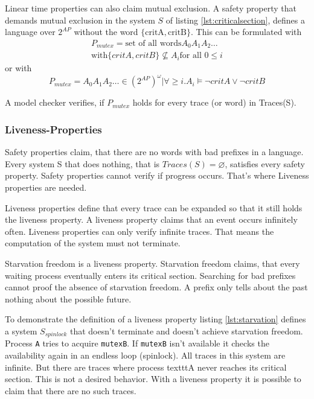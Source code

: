 \documentclass[12pt,a4paper,twoside]{article}
\begin{document}
Linear time properties can also claim mutual exclusion. A safety property that demands mutual exclusion in the system $S$ of listing \ref{lst:criticalsection}, defines a language over $2^{AP}$ without the word $\{\text{critA},\text{critB}\}$. This can be formulated with
\begin{multline}
  \label{eq:mutexinwords}
  P_{mutex} = \text{set of all words} A_0 A_1 A_2 \dots \\ \text{with} \{critA,critB\} \not \subseteq A_i \text{for all } 0 \leq i
\end{multline}
or with
\begin{equation}
  \label{eq:mutex}
P_{mutex}   = {A_0 A_1 A_2 \dots \in (2^{AP})^{\omega} | \forall \geq i.   A_i \models \neg critA \lor \neg critB}
\end{equation}

A model checker verifies, if $P_{mutex}$ holds for every trace (or word) in Tra\-ces(S).

\subsubsection{Liveness-Properties}
\label{sec:liveness}

Safety properties claim, that there are no words with bad prefixes in a language. Every system S that does nothing, that is $Traces(S)=\varnothing$, satisfies every safety property. Safety properties cannot verify if progress occurs. That's where Liveness properties are needed.

Liveness properties define that every trace can be expanded so that it still holds the liveness property. A liveness property claims that an event occurs infinitely often. Liveness properties can only verify infinite traces. That means the computation of the system must not terminate.

Starvation freedom is a liveness property. Starvation freedom claims, that every waiting process eventually enters its critical section. Searching for bad prefixes cannot proof the absence of starvation freedom. A prefix only tells about the past nothing about the possible future.



To demonstrate the definition of a liveness property listing \ref{lst:starvation} defines a system $S_{spinlock}$ that doesn't terminate and doesn't achieve starvation freedom. Process \texttt{A} tries to acquire \texttt{mutexB}. If \texttt{mutexB} isn't available it checks the availability again in an endless loop (spinlock). All traces in this system are infinite. But there are traces where process texttt{A} never reaches its critical section. This is not a desired behavior. With a liveness property it is possible to claim that there are no such traces.
\end{document}
